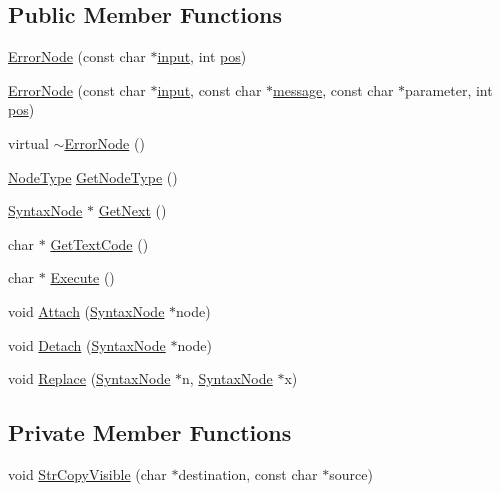 \subsection*{Public Member Functions}
\begin{DoxyCompactItemize}
\item 
\hyperlink{classErrorNode_ac47d46061f61fb60a5c1cf2a61f24a44}{Error\+Node} (const char $\ast$\hyperlink{classErrorNode_ac2cc563162c10fff090113340184bb4b}{input}, int \hyperlink{classErrorNode_a2f9577d7885985f6a5671a14d64a75cf}{pos})
\item 
\hyperlink{classErrorNode_a1c3d4afac02da7fcc0cec125a7ac03ba}{Error\+Node} (const char $\ast$\hyperlink{classErrorNode_ac2cc563162c10fff090113340184bb4b}{input}, const char $\ast$\hyperlink{classErrorNode_abd0f6fbd4876d013fbb7b6a9d5ce673e}{message}, const char $\ast$parameter, int \hyperlink{classErrorNode_a2f9577d7885985f6a5671a14d64a75cf}{pos})
\item 
virtual \hyperlink{classErrorNode_a49380518442827777fa57e620d24d49b}{$\sim$\+Error\+Node} ()
\item 
\hyperlink{nodes_8h_acac9cbaeea226ed297804c012dc12b16}{Node\+Type} \hyperlink{classErrorNode_ae4ef9fa304ae75c7c8fd04627143a8b1}{Get\+Node\+Type} ()
\item 
\hyperlink{classSyntaxNode}{Syntax\+Node} $\ast$ \hyperlink{classErrorNode_acf4a67072dae31ff931446541b873b81}{Get\+Next} ()
\item 
char $\ast$ \hyperlink{classErrorNode_aed876f8645b44aa8081fa62d7e4e3bca}{Get\+Text\+Code} ()
\item 
char $\ast$ \hyperlink{classErrorNode_a351cbedab751832da6a67b12ac0abcab}{Execute} ()
\item 
void \hyperlink{classErrorNode_ae56dac4fba9187e37fc4270871e05a56}{Attach} (\hyperlink{classSyntaxNode}{Syntax\+Node} $\ast$node)
\item 
void \hyperlink{classErrorNode_a26cd4f0a90f8f5fa86efb4d9a707b938}{Detach} (\hyperlink{classSyntaxNode}{Syntax\+Node} $\ast$node)
\item 
void \hyperlink{classErrorNode_a21d26027d05d8051ac3a1add5466dc37}{Replace} (\hyperlink{classSyntaxNode}{Syntax\+Node} $\ast$n, \hyperlink{classSyntaxNode}{Syntax\+Node} $\ast$x)
\end{DoxyCompactItemize}
\subsection*{Private Member Functions}
\begin{DoxyCompactItemize}
\item 
void \hyperlink{classErrorNode_a2e51822b04905fc867d13546af61abb8}{Str\+Copy\+Visible} (char $\ast$destination, const char $\ast$source)
\end{DoxyCompactItemize}
